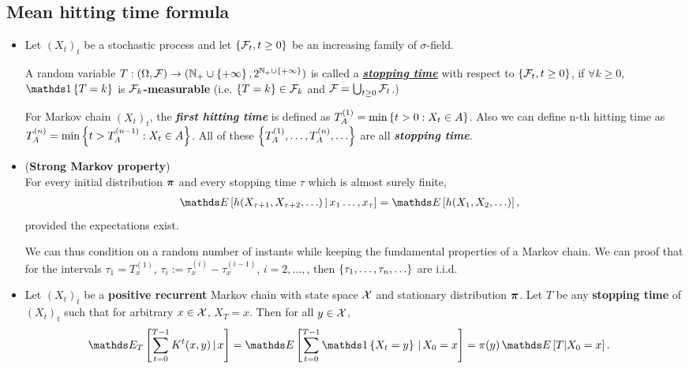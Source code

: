 \documentclass[11pt]{article}
\begin{document}
\subsection{Mean hitting time formula}
\begin{itemize}
\item \begin{definition}
Let $(X_t)_t$ be a stochastic process and let $\left\{{\mathcal F}_{t}, t\ge 0\right\}$ be an increasing family of $\sigma$-field. 

A random variable $T: (\Omega, {\mathcal F}) \rightarrow ({\mathbb N}_{+}\cup\left\{+\infty\right\}, 2^{{\mathbb N}_{+}\cup\left\{+\infty\right\}})$ is called a \underline{\textbf{\emph{stopping time}}} with respect to $\left\{{\mathcal F}_{t}, t\ge 0\right\}$, if $\forall k \ge 0$, $\ind{T = k}$ is \textbf{${\mathcal F}_{k}$-measurable} (i.e. $\left\{T = k\right\} \in {\mathcal F}_{k}$ and ${\mathcal F} = \bigcup_{t\ge 0} {\mathcal F}_t$.)
\end{definition}

For Markov chain $(X_t)_t$, the \emph{\textbf{first hitting time}} is defined as $T_{A}^{(1)} = \min\left\{t > 0: X_t \in A\right\}$. Also we can define n-th hitting time as $T_{A}^{(n)} = \min\left\{t > T_{A}^{(n-1)}: X_t \in A\right\}$. All of these $\left\{T_{A}^{(1)}, \ldots, T_{A}^{(n)}, \ldots \right\}$ are all \emph{\textbf{stopping time}}. 

\item \begin{theorem}(\textbf{Strong Markov property}) \citep{robert1999monte}\\
For every initial distribution $\boldsymbol{\pi}$ and every stopping time $\tau$ which is almost surely finite,
\begin{align}
\E{}{h(X_{\tau+1},X_{\tau+2},\ldots)\,|\,x_{1}\ldots,x_{\tau}} &= \E{}{h(X_1 ,X_2, \ldots )}, \label{eqn: mc_strong_markov}
\end{align} provided the expectations exist.
\end{theorem} We can thus condition on a random number of instants while keeping the fundamental properties of a Markov chain.
We can proof that for the intervals $\tau_1 = T_{x}^{(1)}$, $\tau_{i} := \tau_{x}^{(i)} - \tau_{x}^{(i-1)}$, $i=2,\ldots,$, then $\left\{\tau_1,\ldots, \tau_n,\ldots\right\}$ are i.i.d.
\item 
\begin{theorem}
Let $(X_t)_t$ be a \textbf{positive recurrent} Markov chain with state space ${\mathcal X}$ and stationary distribution $\boldsymbol{\pi}$. Let $T$ be any \textbf{stopping time} of $(X_t)_t$ such that for arbitrary $x \in {\mathcal X}$, $X_{T} = x$. Then for all $y \in {\mathcal X}$, 
\begin{align}
\E{T}{\sum_{t=0}^{T-1}K^{t}(x,y)\,|\,x} = \E{}{\sum_{t=0}^{T-1}\ind{X_{t} = y}\,|\,X_0 = x} &= \pi(y)\,\E{}{T | X_{0} = x}. \label{eqn: stopping_time_pos_recur}
\end{align}
\end{theorem}


\end{itemize}
\end{document}
